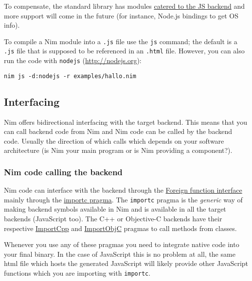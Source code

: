 To compensate, the standard library has modules
\href{lib.html\#pure-libraries-modules-for-js-backend}{catered to the JS
backend} and more support will come in the future (for instance, Node.js
bindings to get OS info).

To compile a Nim module into a \texttt{.js} file use the \texttt{js}
command; the default is a \texttt{.js} file that is supposed to be
referenced in an \texttt{.html} file. However, you can also run the code
with \texttt{nodejs} (\url{http://nodejs.org}):

\begin{verbatim}
nim js -d:nodejs -r examples/hallo.nim
\end{verbatim}

\hypertarget{interfacing}{%
\subsection{Interfacing}\label{interfacing}}

Nim offers bidirectional interfacing with the target backend. This means
that you can call backend code from Nim and Nim code can be called by
the backend code. Usually the direction of which calls which depends on
your software architecture (is Nim your main program or is Nim providing
a component?).

\hypertarget{nim-code-calling-the-backend}{%
\subsubsection{Nim code calling the
backend}\label{nim-code-calling-the-backend}}

Nim code can interface with the backend through the
\href{manual.html\#foreign-function-interface}{Foreign function
interface} mainly through the
\href{manual.html\#foreign-function-interface-importc-pragma}{importc
pragma}. The \texttt{importc} pragma is the \emph{generic} way of making
backend symbols available in Nim and is available in all the target
backends (JavaScript too). The C++ or Objective-C backends have their
respective
\href{manual.html\#implementation-specific-pragmas-importcpp-pragma}{ImportCpp}
and
\href{manual.html\#implementation-specific-pragmas-importobjc-pragma}{ImportObjC}
pragmas to call methods from classes.

Whenever you use any of these pragmas you need to integrate native code
into your final binary. In the case of JavaScript this is no problem at
all, the same html file which hosts the generated JavaScript will likely
provide other JavaScript functions which you are importing with
\texttt{importc}.

